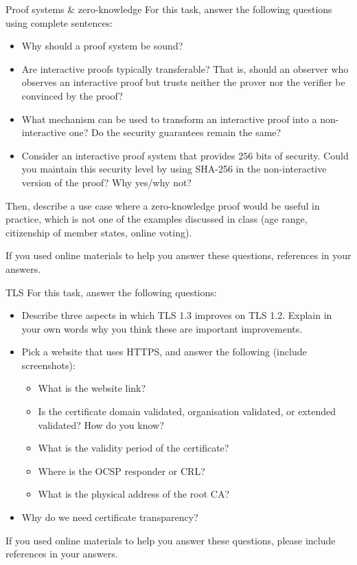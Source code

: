 \documentclass{homework}
\begin{document}
\begin{task}{Proof systems \& zero-knowledge}
  For this task, answer the following questions using complete sentences:
  \begin{itemize}
    \item Why should a proof system be sound?

    \item Are interactive proofs typically transferable?
    That is, should an observer who observes an interactive proof but trusts neither the prover nor the verifier be convinced by the proof?

    \item What mechanism can be used to transform an interactive proof into a non-interactive one?
    Do the security guarantees remain the same?

    \item Consider an interactive proof system that provides $256$ bits of security.
    Could you maintain this security level by using SHA-256 in the non-interactive version of the proof?
    Why yes/why not?
  \end{itemize}

  Then, describe a use case where a zero-knowledge proof would be useful in practice, which is not one of the examples discussed in class (age range, citizenship of member states, online voting).

  If you used online materials to help you answer these questions, references in your answers.
\end{task}

\newpage

\begin{task}{TLS}
  For this task, answer the following questions:
  \begin{itemize}
    \item Describe three aspects in which TLS 1.3 improves on TLS 1.2.
    Explain in your own words why you think these are important improvements.

    \item Pick a website that uses HTTPS, and answer the following (include screenshots):
    \begin{itemize}
      \item What is the website link?
      \item Is the certificate domain validated, organisation validated, or extended validated?
      How do you know?
      \item What is the validity period of the certificate?
      \item Where is the OCSP responder or CRL?
      \item What is the physical address of the root CA?
    \end{itemize}

    \item Why do we need certificate transparency?
  \end{itemize}

  If you used online materials to help you answer these questions, please include references in your answers.
\end{task}
\end{document}
